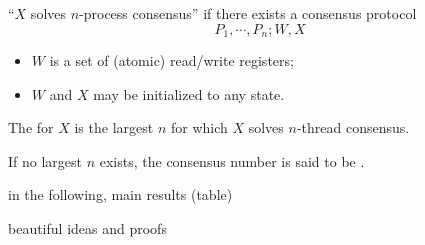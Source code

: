 \begin{frame}{}
  \begin{definition}
    ``$X$ solves $n$-process consensus'' if there exists a consensus protocol
    \[
      P_1, \cdots, P_n; W, X
    \]
    \begin{itemize}
      \item $W$ is a set of (atomic) read/write registers;
      \item $W$ and $X$ may be initialized to any state.
    \end{itemize}
  \end{definition}
\end{frame}

\begin{frame}{}
  \begin{definition}
    The  for $X$ is the largest $n$ 
    for which $X$ solves $n$-thread consensus.

    \vspace{0.30cm}
    If no largest $n$ exists, the consensus number is said to be .
  \end{definition}
\end{frame}

\begin{frame}{}
  \begin{lemma}[$Y$ Implements $X$]
  \end{lemma}

  \vspace{0.50cm}
  \begin{theorem}
  \end{theorem}
\end{frame}

\begin{frame}{}
  in the following, main results (table)
\end{frame}

\begin{frame}{}
  beautiful ideas and proofs
\end{frame}

\begin{frame}{}
  \begin{columns}
  \end{columns}
\end{frame}
